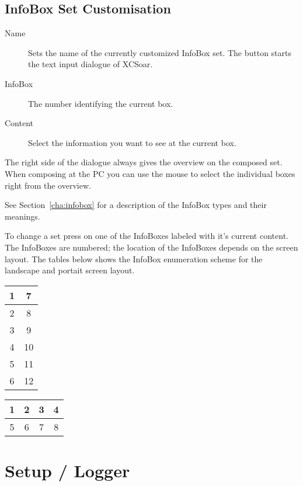 \subsection*{InfoBox Set Customisation}

\begin{description}
\item[Name]  Sets the name of the currently customized InfoBox set. The 
  button starts the text input dialogue of XCSoar.
\item[InfoBox]  The number identifying the current box.
\item[Content]  Select the information you want to see at the current box.
\end{description}

The right side of the dialogue always gives the overview on the composed set. 
When composing at the PC you can use the mouse to select the individual boxes 
right from the overview.

See Section~\ref{cha:infobox} for a description of the InfoBox types and their meanings.

To change a set press on one of the InfoBoxes labeled with it's current content.
The InfoBoxes are numbered; the location of the InfoBoxes depends on the screen layout.  
The tables below shows the InfoBox enumeration scheme for the 
landscape and portait screen layout.

\begin{multicols}{2}
\begin{tabular}{|c|c|}
\hline
1 & 7 \\
\hline
2 & 8 \\
\hline
3 & 9 \\
\hline
4 & 10 \\
\hline
5 & 11 \\
\hline
6 & 12 \\
\hline
\end{tabular}

\begin{tabular}{|c|c|c|c|}
\hline
1 & 2 & 3 & 4 \\
\hline
\hline
5 & 6 & 7 & 8 \\
\hline
\end{tabular}
\end{multicols}


\section{Setup / Logger} \label{conf:logger}

